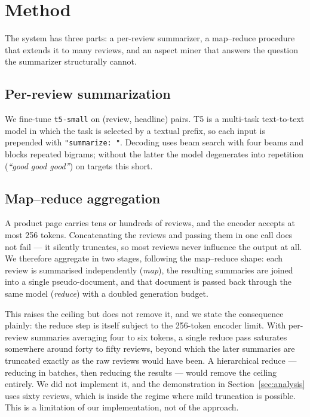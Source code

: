 \section{Method}
\label{sec:method}

The system has three parts: a per-review summarizer, a map--reduce procedure
that extends it to many reviews, and an aspect miner that answers the question
the summarizer structurally cannot.

\subsection{Per-review summarization}

We fine-tune \texttt{t5-small} \cite{raffel2020t5} on (review, headline) pairs.
T5 is a multi-task text-to-text model in which the task is selected by a
textual prefix, so each input is prepended with \texttt{"summarize: "}.
Decoding uses beam search with four beams and blocks repeated bigrams; without
the latter the model degenerates into repetition (\emph{``good good good''}) on
targets this short.

\subsection{Map--reduce aggregation}

A product page carries tens or hundreds of reviews, and the encoder accepts at
most 256 tokens. Concatenating the reviews and passing them in one call does
not fail --- it silently truncates, so most reviews never influence the output
at all. We therefore aggregate in two stages, following the map--reduce shape:
each review is summarised independently (\emph{map}), the resulting summaries
are joined into a single pseudo-document, and that document is passed back
through the same model (\emph{reduce}) with a doubled generation budget.

This raises the ceiling but does not remove it, and we state the consequence
plainly: the reduce step is itself subject to the 256-token encoder limit. With
per-review summaries averaging four to six tokens, a single reduce pass
saturates somewhere around forty to fifty reviews, beyond which the later
summaries are truncated exactly as the raw reviews would have been. A
hierarchical reduce --- reducing in batches, then reducing the results ---
would remove the ceiling entirely. We did not implement it, and the
demonstration in Section~\ref{sec:analysis} uses sixty reviews, which is inside
the regime where mild truncation is possible. This is a limitation of our
implementation, not of the approach.

